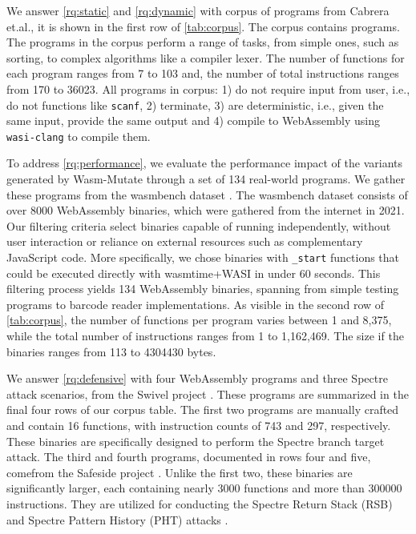 \documentclass[a4paper,fleqn]{cas-dc}
\newcommand{\tool}{{\sc Wasm-Mutate}\xspace}
\newcommand{\Wasm}{WebAssembly\xspace}
\newcommand{\wasm}{\Wasm}
\newcommand{\etal}{et.al.\xspace}
\newcommand{\ie}{i.e.,\xspace}
\newenvironment{revision1}{\color{blue}}{}
\begin{document}
We answer \ref{rq:static} and \ref{rq:dynamic} with corpus of programs from Cabrera \etal \cite{arteaga2020crow}, it is shown in the first row of \autoref{tab:corpus}.
The corpus contains \nProgramsRosetta programs.
The programs in the corpus perform a range of tasks, from simple ones, such as sorting, to complex algorithms like a compiler lexer. 
The number of functions for each program ranges from 7 to 103 and, the number of total instructions ranges from 170 to 36023.
All programs in corpus: 
1) do not require input from user, \ie do not  functions like \texttt{scanf}, 2) terminate, 3) are deterministic, \ie given the same input, provide the same output and 4) compile to \wasm using \texttt{wasi-clang} to compile them.

\begin{revision1}
To address \ref{rq:performance}, we evaluate the performance impact of the variants generated by \tool through a set of 134 real-world programs. 
We gather these programs from the wasmbench dataset \cite{hilbig2021empirical}. 
The wasmbench dataset consists of over 8000 \Wasm binaries, which were gathered from the internet in 2021. 
Our filtering criteria select binaries capable of running independently, without user interaction or reliance on external resources such as complementary JavaScript code. 
More specifically, we chose binaries with \texttt{_start} functions that could be executed directly with wasmtime+WASI in under 60 seconds. 
This filtering process yields 134 \Wasm binaries, spanning from simple testing programs to barcode reader implementations. 
As visible in the second row of \autoref{tab:corpus}, the number of functions per program varies between 1 and 8,375, while the total number of instructions ranges from 1 to 1,162,469.
The size if the binaries ranges from 113 to 4304430 bytes. 
\end{revision1}

We answer \ref{rq:defensive} with four \Wasm programs and three Spectre attack scenarios, from the Swivel project \cite{Swivel}. 
These programs are summarized in the final four rows of our corpus table.
The first two programs are manually crafted and contain 16 functions, with instruction counts of 743 and 297, respectively. These binaries are specifically designed to perform the Spectre branch target attack.
The third and fourth programs, documented in rows four and five, comefrom the Safeside project \cite{safeside}. 
Unlike the first two, these binaries are significantly larger, each containing nearly 3000 functions and more than 300000 instructions. 
They are utilized for conducting the Spectre Return Stack (RSB) and Spectre Pattern History (PHT) attacks \cite{Spectre}.
\end{document}
